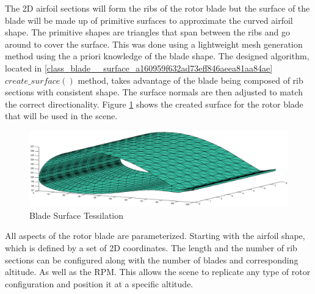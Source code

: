 The 2D airfoil sections will form the ribs of the rotor blade but the surface of the blade will be made up of primitive surfaces to approximate the curved airfoil shape. The primitive shapes are triangles that span between the ribs and go around to cover the surface. This was done using a lightweight mesh generation method using the a priori knowledge of the blade shape. The designed algorithm, located in \ref{class_blade__surface_a160959f632ad73eff846aeea81aa84ae} $create\_surface()$ method, takes advantage of the blade being composed of rib sections with consistent shape. The surface normals are then adjusted to match the correct directionality. Figure \ref{fig:tessilation} shows the created surface for the rotor blade that will be used in the scene.

\begin{figure}
	\begin{center}
		\includegraphics[width=15cm]{images/radio_propagation/blade_surface_tesselation.eps}
		\caption{Blade Surface Tessilation}
		\label{fig:tessilation}
	\end{center}
\end{figure}

All aspects of the rotor blade are parameterized. Starting with the airfoil shape, which is defined by a set of 2D coordinates. The length and the number of rib sections can be configured along with the number of blades and corresponding altitude. As well as the RPM. This allows the scene to replicate any type of rotor configuration and position it at a specific altitude.

